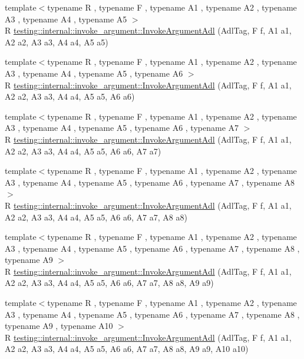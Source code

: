 \begin{DoxyCompactItemize}
\item 
{\footnotesize template$<$typename R , typename F , typename A1 , typename A2 , typename A3 , typename A4 , typename A5 $>$ }\\R \hyperlink{namespacetesting_1_1internal_1_1invoke__argument_a371c08ae03d150520e8bda58fb4574c3}{testing\+::internal\+::invoke\+\_\+argument\+::\+Invoke\+Argument\+Adl} (Adl\+Tag, F f, A1 a1, A2 a2, A3 a3, A4 a4, A5 a5)
\item 
{\footnotesize template$<$typename R , typename F , typename A1 , typename A2 , typename A3 , typename A4 , typename A5 , typename A6 $>$ }\\R \hyperlink{namespacetesting_1_1internal_1_1invoke__argument_a16bf1b90d183210a82fbbef4e2eef1c5}{testing\+::internal\+::invoke\+\_\+argument\+::\+Invoke\+Argument\+Adl} (Adl\+Tag, F f, A1 a1, A2 a2, A3 a3, A4 a4, A5 a5, A6 a6)
\item 
{\footnotesize template$<$typename R , typename F , typename A1 , typename A2 , typename A3 , typename A4 , typename A5 , typename A6 , typename A7 $>$ }\\R \hyperlink{namespacetesting_1_1internal_1_1invoke__argument_a77f581ed8b270ed4752d49d5bdd59e84}{testing\+::internal\+::invoke\+\_\+argument\+::\+Invoke\+Argument\+Adl} (Adl\+Tag, F f, A1 a1, A2 a2, A3 a3, A4 a4, A5 a5, A6 a6, A7 a7)
\item 
{\footnotesize template$<$typename R , typename F , typename A1 , typename A2 , typename A3 , typename A4 , typename A5 , typename A6 , typename A7 , typename A8 $>$ }\\R \hyperlink{namespacetesting_1_1internal_1_1invoke__argument_a43c35b90896110940a0cc41c337ca306}{testing\+::internal\+::invoke\+\_\+argument\+::\+Invoke\+Argument\+Adl} (Adl\+Tag, F f, A1 a1, A2 a2, A3 a3, A4 a4, A5 a5, A6 a6, A7 a7, A8 a8)
\item 
{\footnotesize template$<$typename R , typename F , typename A1 , typename A2 , typename A3 , typename A4 , typename A5 , typename A6 , typename A7 , typename A8 , typename A9 $>$ }\\R \hyperlink{namespacetesting_1_1internal_1_1invoke__argument_a6e204965286414aac5113286eb5c8996}{testing\+::internal\+::invoke\+\_\+argument\+::\+Invoke\+Argument\+Adl} (Adl\+Tag, F f, A1 a1, A2 a2, A3 a3, A4 a4, A5 a5, A6 a6, A7 a7, A8 a8, A9 a9)
\item 
{\footnotesize template$<$typename R , typename F , typename A1 , typename A2 , typename A3 , typename A4 , typename A5 , typename A6 , typename A7 , typename A8 , typename A9 , typename A10 $>$ }\\R \hyperlink{namespacetesting_1_1internal_1_1invoke__argument_abd36164191a3e386c50243074854b272}{testing\+::internal\+::invoke\+\_\+argument\+::\+Invoke\+Argument\+Adl} (Adl\+Tag, F f, A1 a1, A2 a2, A3 a3, A4 a4, A5 a5, A6 a6, A7 a7, A8 a8, A9 a9, A10 a10)

\end{DoxyCompactItemize}
